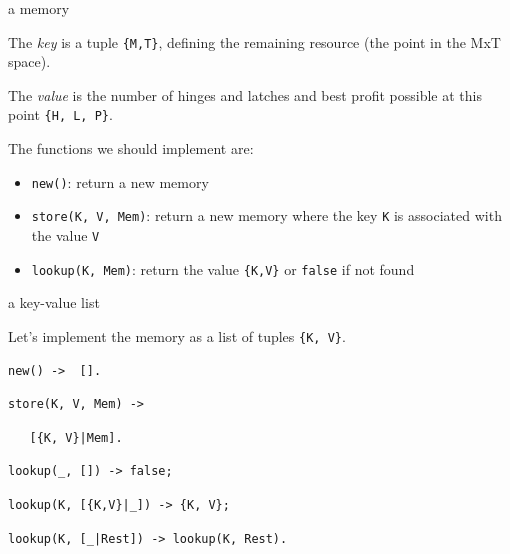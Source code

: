 \begin{frame}[fragile]{a memory}

\vspace{10pt}\pause

The {\em key} is a tuple \texttt{\{M,T\}}, defining the remaining resource (the point in the MxT space).

\vspace{10pt}\pause

The {\em value} is the number of hinges and latches and best profit possible at this point \texttt{\{H, L, P\}}.

\vspace{10pt}\pause

The functions we should implement are:

\begin{itemize}
\pause \item \texttt{new()}: return a new memory
\pause \item \texttt{store(K, V, Mem)}: return a new memory where the key \texttt{K} is associated with the value \texttt{V}
\pause \item \texttt{lookup(K, Mem)}: return the value \texttt{\{K,V\}} or \texttt{false} if not found
\end{itemize}

\end{frame}


\begin{frame}[fragile]{a key-value list}

Let's implement the memory as a list of tuples \texttt{\{K, V\}}.

\pause \vspace{10pt}
\begin{verbatim}
new() ->  [].
\end{verbatim}

\pause\vspace{5pt}
\begin{verbatim}
store(K, V, Mem) ->  
\end{verbatim}
\pause
\begin{verbatim}
   [{K, V}|Mem].
\end{verbatim}

\pause\vspace{5pt}
\begin{verbatim}
lookup(_, []) -> false;
\end{verbatim}\pause
\begin{verbatim}
lookup(K, [{K,V}|_]) -> {K, V};
\end{verbatim}
\pause
\begin{verbatim}
lookup(K, [_|Rest]) -> lookup(K, Rest).
\end{verbatim}

\end{frame}


